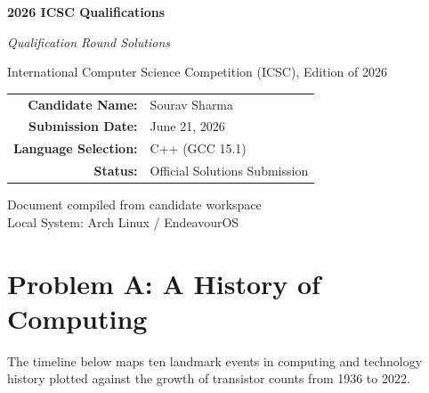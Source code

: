 \documentclass[11pt,a4paper]{article}
\begin{document}
\begin{titlepage}
    \centering
    \vspace*{1.5in}
    
    \begin{tcolorbox}[
        enhanced,
        colback=white,
        colframe=midblue,
        arc=0mm,
        leftrule=4pt,
        rightrule=0pt,
        toprule=0pt,
        bottomrule=0pt,
        boxsep=0pt,
        left=15pt,
        right=15pt,
        top=5pt,
        bottom=5pt
    ]
        {\color{darknavy}\Huge\bfseries 2026 ICSC Qualifications\par}
        \vspace{0.1in}
        {\color{midblue}\Large\itshape Qualification Round Solutions\par}
    \end{tcolorbox}
    
    \vspace{0.4in}
    {\color{commentgray}\large International Computer Science Competition (ICSC), Edition of 2026\par}
    \vspace{0.8in}
    
    \begin{tcolorbox}[
        colback=bgcode,
        colframe=bordercode,
        boxrule=1pt,
        arc=6pt,
        width=0.75\textwidth,
        left=20pt,
        right=20pt,
        top=15pt,
        bottom=15pt
    ]
        \centering
        \renewcommand{\arraystretch}{1.5}
        \begin{tabular}{r l}
            \textbf{\color{charcoal}Candidate Name:} & Sourav Sharma \\
            \textbf{\color{charcoal}Submission Date:} & June 21, 2026 \\
            \textbf{\color{charcoal}Language Selection:} & C++ (GCC 15.1) \\
            \textbf{\color{charcoal}Status:} & Official Solutions Submission
        \end{tabular}
    \end{tcolorbox}
    
    \vfill
    {\color{commentgray}\small Document compiled from candidate workspace \\ Local System: Arch Linux / EndeavourOS}
\end{titlepage}

\newpage

\section{Problem A: A History of Computing}
The timeline below maps ten landmark events in computing and technology history plotted against the growth of transistor counts from 1936 to 2022.
\end{document}
